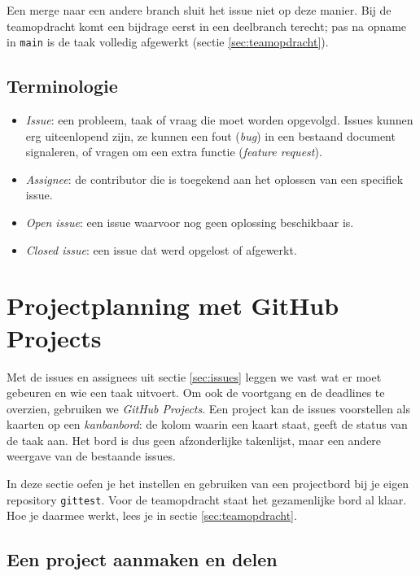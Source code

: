 \documentclass[kulak]{kulakarticle} %
\begin{document}
	Een merge naar een andere branch sluit het issue niet op deze manier. Bij de teamopdracht komt een bijdrage eerst in een deelbranch terecht; pas na opname in \texttt{main} is de taak volledig afgewerkt (sectie \ref{sec:teamopdracht}).

	\subsection{Terminologie}
	
	\begin{itemize}
		\item \emph{Issue}: een probleem, taak of vraag die moet worden opgevolgd. Issues kunnen erg uiteenlopend zijn, ze kunnen een fout (\emph{bug}) in een bestaand document signaleren, of vragen om een extra functie (\emph{feature request}).
		\item \emph{Assignee}: de contributor die is toegekend aan het oplossen van een specifiek issue.
		\item \emph{Open issue}: een issue waarvoor nog geen oplossing beschikbaar is.
		\item \emph{Closed issue}: een issue dat werd opgelost of afgewerkt.
	\end{itemize}
	
\section{Projectplanning met GitHub Projects}
\label{sec:github-projectplanning}

Met de issues en assignees uit sectie \ref{sec:issues} leggen we vast wat er
moet gebeuren en wie een taak uitvoert. Om ook de voortgang en de deadlines
te overzien, gebruiken we
\emph{GitHub Projects}. Een project kan de issues voorstellen als kaarten op
een \emph{kanbanbord}: de kolom waarin een kaart staat, geeft de status van
de taak aan. Het bord is dus geen afzonderlijke takenlijst, maar een andere
weergave van de bestaande issues.

In deze sectie oefen je het instellen en gebruiken van een projectbord bij
je eigen repository \texttt{gittest}. Voor de teamopdracht staat het
gezamenlijke bord al klaar. Hoe je daarmee werkt, lees je in sectie
\ref{sec:teamopdracht}.

\subsection{Een project aanmaken en delen}
\end{document}
